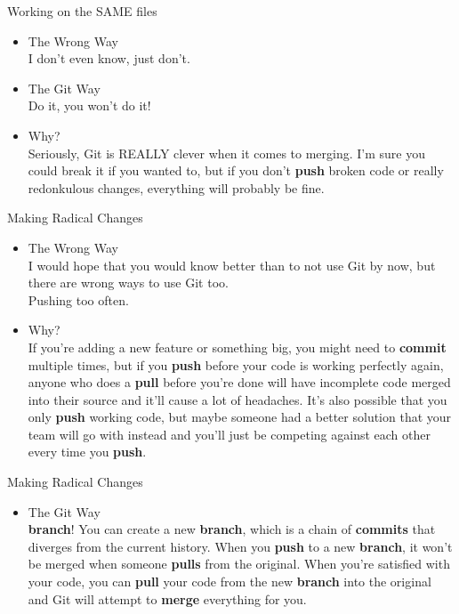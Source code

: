\documentclass{beamer}
\begin{document}
\begin{frame}{Working on the SAME files}
\begin{itemize}
\item The Wrong Way\\
        I don't even know, just don't.
\pause
\item The Git Way\\
        Do it, you won't do it!
\pause
  \item Why?\\
        Seriously, Git is REALLY clever when it comes to merging. I'm sure you could break it if you wanted to, but if you don't \textbf{push} broken code or really redonkulous changes, everything will probably be fine.
\end{itemize}
\end{frame}

\begin{frame}{Making Radical Changes}
  \begin{itemize}
    \item The Wrong Way\\
            I would hope that you would know better than to not use Git by now, but there are wrong ways to use Git too.\\
            Pushing too often.
    \pause
    \item Why?\\
            If you're adding a new feature or something big, you might need to \textbf{commit} multiple times, but if you \textbf{push} before your code is working perfectly again, anyone who does a \textbf{pull} before you're done will have incomplete code merged into their source and it'll cause a lot of headaches. It's also possible that you only \textbf{push} working code, but maybe someone had a better solution that your team will go with instead and you'll just be competing against each other every time you \textbf{push}.
          \end{itemize}
          \end{frame}
\begin{frame}{Making Radical Changes}
  \begin{itemize}
    \item The Git Way\\
            \textbf{branch}! You can create a new \textbf{branch}, which is a chain of \textbf{commits} that diverges from the current history. When you \textbf{push} to a new \textbf{branch}, it won't be merged when someone \textbf{pulls} from the original. When you're satisfied with your code, you can \textbf{pull} your code from the new \textbf{branch} into the original and Git will attempt to \textbf{merge} everything for you.
  \end{itemize}
\end{frame}
\end{document}
